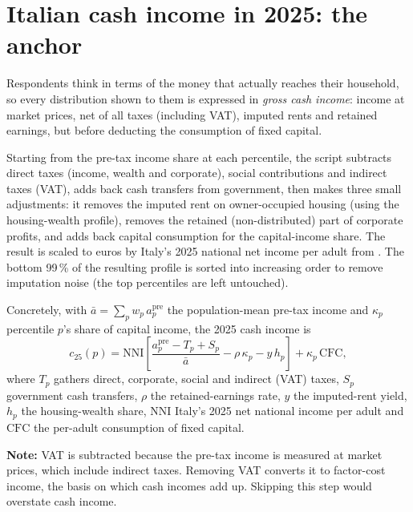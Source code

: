 \documentclass[12pt,a4paper]{article}
\newcommand{\note}[1]{%
  \begin{center}
    \colorbox{yellow!30}{\parbox{0.9\linewidth}{\textbf{Note:} #1}}
  \end{center}}
\begin{document}
\section{Italian cash income in 2025: the anchor}
\label{sec:cash2025}

Respondents think in terms of the money that actually reaches their household, so every distribution shown to them is expressed in \emph{gross cash income}: income at market prices, net of all taxes (including VAT), imputed rents and retained earnings, but before deducting the consumption of fixed capital. %

Starting from the \citet{FisherGethin2023} pre-tax income share at each percentile, the script subtracts direct taxes (income, wealth and corporate), social contributions and indirect taxes (VAT), adds back cash transfers from government, then makes three small adjustments: it removes the imputed rent on owner-occupied housing (using the \citealt{Garbinti2021} housing-wealth profile), removes the retained (non-distributed) part of corporate profits, and adds back capital consumption for the capital-income share. %
The result is scaled to euros by Italy's 2025 national net income per adult from \cite{Bothe2026}. The bottom 99\,\% of the resulting profile is sorted into increasing order to remove imputation noise (the top percentiles are left untouched).

Concretely, with $\bar a=\sum_p w_p\,a^{\mathrm{pre}}_p$ the population-mean pre-tax income and $\kappa_p$ percentile $p$'s share of capital income, the 2025 cash income is
\[
  c_{25}(p)=\mathrm{NNI}\left[\frac{a^{\mathrm{pre}}_p-T_p+S_p}{\bar a}-\rho\,\kappa_p-y\,h_p\right]+\kappa_p\,\mathrm{CFC},
\]
where $T_p$ gathers direct, corporate, social and indirect (VAT) taxes, $S_p$ government cash transfers, $\rho$ the retained-earnings rate, $y$ the imputed-rent yield, $h_p$ the housing-wealth share, $\mathrm{NNI}$ Italy's 2025 net national income per adult and $\mathrm{CFC}$ the per-adult consumption of fixed capital.

\note{%
  VAT is subtracted because the \citet{FisherGethin2023} pre-tax income is measured at market prices, which include indirect taxes. Removing VAT converts it to factor-cost income, the basis on which cash incomes add up. Skipping this step would overstate cash income.
}
\end{document}
